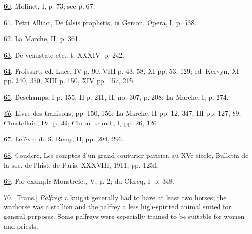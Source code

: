 \protect\hypertarget{23_NOTES.xhtmlux5cux23id_354}{\protect\hyperlink{20_ILLUSTRATIONS_FOLLOW_PAGE.xhtmlux5cux23id_353}{60}}.
Molinet, I, p. 73; see p. 67.

\protect\hypertarget{23_NOTES.xhtmlux5cux23id_352}{\protect\hyperlink{20_ILLUSTRATIONS_FOLLOW_PAGE.xhtmlux5cux23id_351}{61}}.
Petri Alliaci, De falsis prophetis, in Gerson, Opera, I, p. 538.

\protect\hypertarget{23_NOTES.xhtmlux5cux23page_434}{\protect\hyperlink{20_ILLUSTRATIONS_FOLLOW_PAGE.xhtmlux5cux23id_350}{62}}.
La Marche, II, p. 361.

\protect\hypertarget{23_NOTES.xhtmlux5cux23id_349}{\protect\hyperlink{20_ILLUSTRATIONS_FOLLOW_PAGE.xhtmlux5cux23id_348}{63}}.
De venustate etc., t. XXXIV, p. 242.

\protect\hypertarget{23_NOTES.xhtmlux5cux23id_347}{\protect\hyperlink{20_ILLUSTRATIONS_FOLLOW_PAGE.xhtmlux5cux23id_346}{64}}.
Froissart, ed. Luce, IV p. 90, VIII p. 43, 58, XI pp. 53, 129; ed.
Kervyn, XI pp. 340, 360, XIII p. 150, XIV pp. 157, 215.

\protect\hypertarget{23_NOTES.xhtmlux5cux23id_345}{\protect\hyperlink{20_ILLUSTRATIONS_FOLLOW_PAGE.xhtmlux5cux23id_344}{65}}.
Deschamps, I p. 155; II p. 211, II, no. 307, p. 208; La Marche, I, p.
274.

\emph{\protect\hypertarget{23_NOTES.xhtmlux5cux23id_343}{\protect\hyperlink{20_ILLUSTRATIONS_FOLLOW_PAGE.xhtmlux5cux23id_342}{66}}}.
Livre des trahisons, pp. 150, 156; La Marche, II pp. 12, 347, III pp.
127, 89; Chastellain, IV, p. 44; Chron. scand., I, pp. 26, 126.

\protect\hypertarget{23_NOTES.xhtmlux5cux23id_341}{\protect\hyperlink{20_ILLUSTRATIONS_FOLLOW_PAGE.xhtmlux5cux23id_340}{67}}.
Lefèvre de S. Remy, II, pp. 294, 296.

\protect\hypertarget{23_NOTES.xhtmlux5cux23id_339}{\protect\hyperlink{20_ILLUSTRATIONS_FOLLOW_PAGE.xhtmlux5cux23id_338}{68}}.
Couderc, Les comptes d'un grand couturier parisien au XVe siecle,
Bulletin de la soc. de l'hist. de Paris, XXXVIII, 1911, pp. 125ff.

\protect\hypertarget{23_NOTES.xhtmlux5cux23id_337}{\protect\hyperlink{20_ILLUSTRATIONS_FOLLOW_PAGE.xhtmlux5cux23id_336}{69}}.
For example Monstrelet, V, p. 2; du Clercq, I, p. 348.

\protect\hypertarget{23_NOTES.xhtmlux5cux23id_335}{\protect\hyperlink{20_ILLUSTRATIONS_FOLLOW_PAGE.xhtmlux5cux23id_334}{70}}.
{[}Trans.{]} \emph{Palfrey}: a knight generally had to have at least two
horses; the warhorse was a stallion and the palfrey a less high-spirited
animal suited for general purposes. Some palfreys were especially
trained to be suitable for women and priests.

